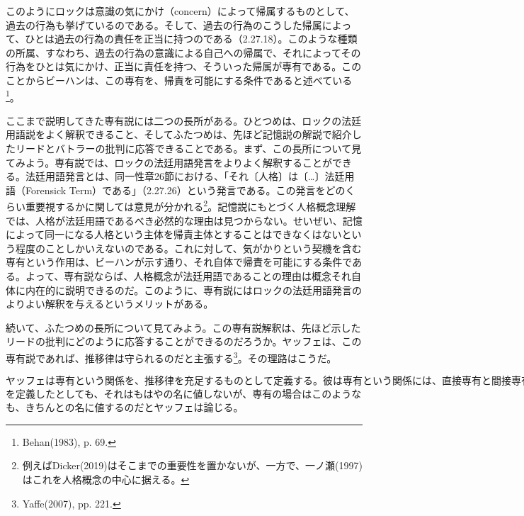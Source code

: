 \documentclass[a4j,oneside]{jsbook}
\begin{document}
このようにロックは意識の気にかけ（concern）によって帰属するものとして、過去の行為も挙げているのである。そして、過去の行為のこうした帰属によって、ひとは過去の行為の責任を正当に持つのである（2.27.18）。このような種類の所属、すなわち、過去の行為の意識による自己への帰属で、それによってその行為をひとは気にかけ、正当に責任を持つ、そういった帰属が専有である。このことからビーハンは、この専有を、帰責を可能にする条件であると述べている\footnote{Behan(1983), p. 69.}。
\par
ここまで説明してきた専有説には二つの長所がある。ひとつめは、ロックの法廷用語説をよく解釈できること、そしてふたつめは、先ほど記憶説の解説で紹介したリードとバトラーの批判に応答できることである。まず、この長所について見てみよう。専有説では、ロックの法廷用語発言をよりよく解釈することができる。法廷用語発言とは、同一性章26節における、「それ〔人格〕は〔…〕法廷用語（Forensick Term）である」（2.27.26）という発言である。この発言をどのくらい重要視するかに関しては意見が分かれる\footnote{例えばDicker(2019)はそこまでの重要性を置かないが、一方で、一ノ瀬(1997)はこれを人格概念の中心に据える。}。記憶説にもとづく人格概念理解では、人格が法廷用語であるべき必然的な理由は見つからない。せいぜい、記憶によって同一になる人格という主体を帰責主体とすることはできなくはないという程度のことしかいえないのである。これに対して、気がかりという契機を含む専有という作用は、ビーハンが示す通り、それ自体で帰責を可能にする条件である。よって、専有説ならば、人格概念が法廷用語であることの理由は概念それ自体に内在的に説明できるのだ。このように、専有説にはロックの法廷用語発言のよりよい解釈を与えるというメリットがある。
\par
続いて、ふたつめの長所について見てみよう。この専有説解釈は、先ほど示したリードの批判にどのように応答することができるのだろうか。ヤッフェは、この専有説であれば、推移律は守られるのだと主張する\footnote{Yaffe(2007), pp. 221.}。その理路はこうだ。
\par
$
ヤッフェは専有という関係を、推移律を充足するものとして定義する。彼は専有という関係には、直接専有と間接専有があると論じ、これを説明する。直接専有とは、ある時点t_2における人格P_2が、ある時点t_1における人格P_1によってなされた行為A_1を「私がした、あるいはしている」と意識的に自覚することである。そして人格P_2が人格P_1によってなされたある行為A_1を直接専有していて、かつ、その人格P_1がその前のある時点t_0において人格P_0がなした行為A_0を専有しているとき、人格P_2は行為A_0を直接的に専有していない場合でも、間接的に専有しているということができるのである。これと同じような仕方で$を定義したとしても、それはもはやの名に値しないが、専有の場合はこのようなも、きちんとの名に値するのだとヤッフェは論じる。
\end{document}
